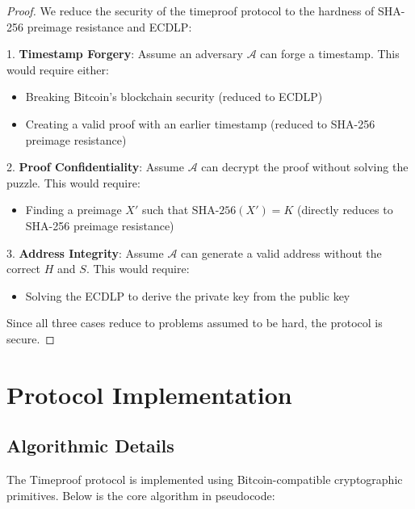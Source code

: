 \documentclass[12pt]{report}
\begin{document}
\begin{proof}
We reduce the security of the timeproof protocol to the hardness of SHA-256 preimage resistance and ECDLP:

1. \textbf{Timestamp Forgery}: 
Assume an adversary \(\mathcal{A}\) can forge a timestamp. This would require either:
\begin{itemize}
    \item Breaking Bitcoin's blockchain security (reduced to ECDLP)
    \item Creating a valid proof with an earlier timestamp (reduced to SHA-256 preimage resistance)
\end{itemize}

2. \textbf{Proof Confidentiality}:
Assume \(\mathcal{A}\) can decrypt the proof without solving the puzzle. This would require:
\begin{itemize}
    \item Finding a preimage \(X'\) such that \(\text{SHA-256}(X') = K\) (directly reduces to SHA-256 preimage resistance)
\end{itemize}

3. \textbf{Address Integrity}:
Assume \(\mathcal{A}\) can generate a valid address without the correct \(H\) and \(S\). This would require:
\begin{itemize}
    \item Solving the ECDLP to derive the private key from the public key
\end{itemize}

Since all three cases reduce to problems assumed to be hard, the protocol is secure.
\end{proof}

\clearpage  %

\section{Protocol Implementation}
\subsection{Algorithmic Details}

The Timeproof protocol is implemented using Bitcoin-compatible cryptographic primitives. Below is the core algorithm in pseudocode:
\end{document}
